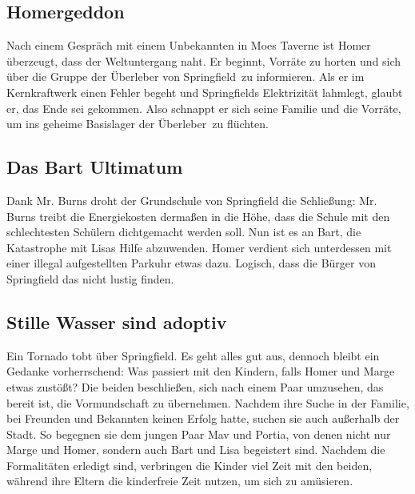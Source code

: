\subsection{Homergeddon}
Nach einem Gespräch mit einem Unbekannten in Moes Taverne ist Homer überzeugt, dass der Weltuntergang naht. Er beginnt, Vorräte zu horten und sich über die Gruppe der \glqq Überleber von Springfield\grqq\ zu informieren. Als er im Kernkraftwerk einen Fehler begeht und Springfields Elektrizität lahmlegt, glaubt er, das Ende sei gekommen. Also schnappt er sich seine Familie und die Vorräte, um ins geheime Basislager der \glqq Überleber\grqq\ zu flüchten.

\subsection{Das Bart Ultimatum}\label{RABF03}
Dank Mr. Burns droht der Grundschule von Springfield die Schließung: Mr. Burns treibt die Energiekosten dermaßen in die Höhe, dass die Schule mit den schlechtesten Schülern dichtgemacht werden soll. Nun ist es an Bart, die Katastrophe mit Lisas Hilfe abzuwenden. Homer verdient sich unterdessen mit einer illegal aufgestellten Parkuhr etwas dazu. Logisch, dass die Bürger von Springfield das nicht lustig finden.


\subsection{Stille Wasser sind adoptiv}\label{RABF04}
Ein Tornado tobt über Springfield. Es geht alles gut aus, dennoch bleibt ein Gedanke vorherrschend: Was passiert mit den Kindern, falls Homer und Marge etwas zustößt? Die beiden beschließen, sich nach einem Paar umzusehen, das bereit ist, die Vormundschaft zu übernehmen. Nachdem ihre Suche in der Familie, bei Freunden und Bekannten keinen Erfolg hatte, suchen sie auch außerhalb der Stadt. So begegnen sie dem jungen Paar Mav und Portia, von denen nicht nur Marge und Homer, sondern auch Bart und Lisa begeistert sind. Nachdem die Formalitäten erledigt sind, verbringen die Kinder viel Zeit mit den beiden, während ihre Eltern die kinderfreie Zeit nutzen, um sich zu amüsieren.

